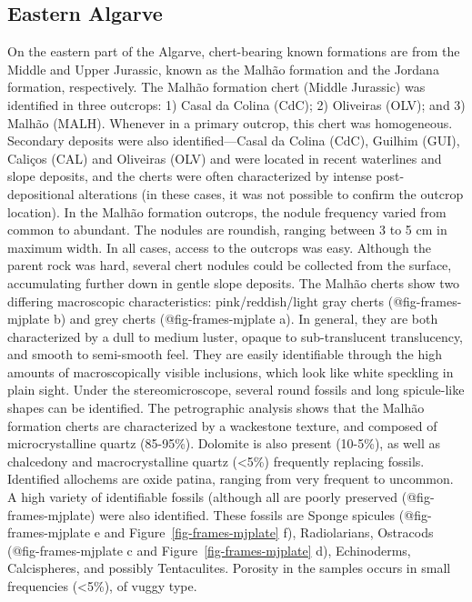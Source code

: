 \documentclass[
  a4paper,
  DIV=11,
  numbers=noendperiod]{scrreprt}
\begin{document}
\subsection*{Eastern Algarve}\label{eastern-algarve}

On the eastern part of the Algarve, chert-bearing known formations are
from the Middle and Upper Jurassic, known as the Malhão formation and
the Jordana formation, respectively. The Malhão formation chert (Middle
Jurassic) was identified in three outcrops: 1) Casal da Colina (CdC); 2)
Oliveiras (OLV); and 3) Malhão (MALH). Whenever in a primary outcrop,
this chert was homogeneous. Secondary deposits were also
identified---Casal da Colina (CdC), Guilhim (GUI), Caliços (CAL) and
Oliveiras (OLV) and were located in recent waterlines and slope
deposits, and the cherts were often characterized by intense
post-depositional alterations (in these cases, it was not possible to
confirm the outcrop location). In the Malhão formation outcrops, the
nodule frequency varied from common to abundant. The nodules are
roundish, ranging between 3 to 5 cm in maximum width. In all cases,
access to the outcrops was easy. Although the parent rock was hard,
several chert nodules could be collected from the surface, accumulating
further down in gentle slope deposits. The Malhão cherts show two
differing macroscopic characteristics: pink/reddish/light gray cherts
(@fig-frames-mjplate b) and grey cherts (@fig-frames-mjplate a). In
general, they are both characterized by a dull to medium luster, opaque
to sub-translucent translucency, and smooth to semi-smooth feel. They
are easily identifiable through the high amounts of macroscopically
visible inclusions, which look like white speckling in plain sight.
Under the stereomicroscope, several round fossils and long spicule-like
shapes can be identified. The petrographic analysis shows that the
Malhão formation cherts are characterized by a wackestone texture, and
composed of microcrystalline quartz (85-95\%). Dolomite is also present
(10-5\%), as well as chalcedony and macrocrystalline quartz
(\textless5\%) frequently replacing fossils. Identified allochems are
oxide patina, ranging from very frequent to uncommon. A high variety of
identifiable fossils (although all are poorly preserved
(@fig-frames-mjplate) were also identified. These fossils are Sponge
spicules (@fig-frames-mjplate e and Figure~\ref{fig-frames-mjplate} f),
Radiolarians, Ostracods (@fig-frames-mjplate c and
Figure~\ref{fig-frames-mjplate} d), Echinoderms, Calcispheres, and
possibly Tentaculites. Porosity in the samples occurs in small
frequencies (\textless5\%), of vuggy type.
\end{document}
